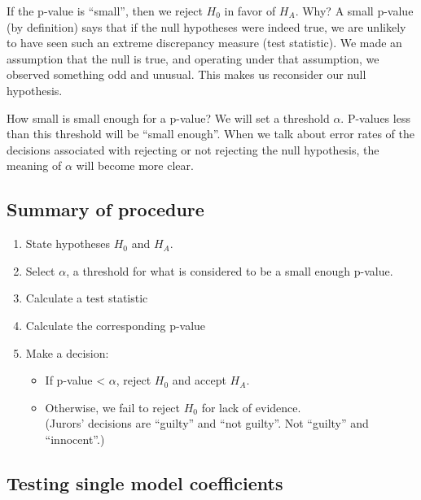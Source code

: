 \documentclass[]{book}
\providecommand{\tightlist}{%
  \setlength{\itemsep}{0pt}\setlength{\parskip}{0pt}}
\begin{document}
If the p-value is ``small'', then we reject \(H_0\) in favor of \(H_A\). Why? A small p-value (by definition) says that if the null hypotheses were indeed true, we are unlikely to have seen such an extreme discrepancy measure (test statistic). We made an assumption that the null is true, and operating under that assumption, we observed something odd and unusual. This makes us reconsider our null hypothesis.

How small is small enough for a p-value? We will set a threshold \(\alpha\). P-values less than this threshold will be ``small enough''. When we talk about error rates of the decisions associated with rejecting or not rejecting the null hypothesis, the meaning of \(\alpha\) will become more clear.

\hypertarget{summary-of-procedure}{%
\subsection{Summary of procedure}\label{summary-of-procedure}}

\begin{enumerate}
\def\labelenumi{\arabic{enumi}.}
\tightlist
\item
  State hypotheses \(H_0\) and \(H_A\).
\item
  Select \(\alpha\), a threshold for what is considered to be a small enough p-value.
\item
  Calculate a test statistic
\item
  Calculate the corresponding p-value
\item
  Make a decision:

  \begin{itemize}
  \tightlist
  \item
    If p-value \textless{} \(\alpha\), reject \(H_0\) and accept \(H_A\).
  \item
    Otherwise, we fail to reject \(H_0\) for lack of evidence.\\
    (Jurors' decisions are ``guilty'' and ``not guilty''. Not ``guilty'' and ``innocent''.)
  \end{itemize}
\end{enumerate}

\hypertarget{testing-single-model-coefficients}{%
\subsection{Testing single model coefficients}\label{testing-single-model-coefficients}}
\end{document}
